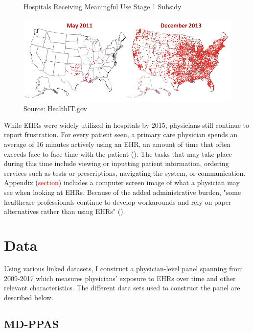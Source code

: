 \documentclass[11pt]{article}
\begin{document}
\begin{figure}[ht]
    \centering
    \caption{Hospitals Receiving Meaningful Use Stage 1 Subsidy}
    \includegraphics[scale=.6]{Objects/QS-Hospitals-Receiving-Payments-for-MU-and-Adoption.png}
    \caption*{Source: HealthIT.gov}
    \label{fig:meanuse}
\end{figure}


While EHRs were widely utilized in hospitals by 2015, physicians still continue to report frustration. For every patient seen, a primary care physician spends an average of 16 minutes actively using an EHR, an amount of time that often exceeds face to face time with the patient (\cite{overhage2020physician}). The tasks that may take place during this time include viewing or inputting patient information, ordering services such as tests or prescriptions, navigating the system, or communication. Appendix (\textcolor{red}{section}) includes a computer screen image of what a physician may see when looking at EHRs. Because of the added administrative burden, "some healthcare professionals continue to develop workarounds and rely on paper alternatives rather than using EHRs" (\cite{evans2016electronic}).

\section{Data}

Using various linked datasets, I construct a physician-level panel spanning from 2009-2017 which measures physicians' exposure to EHRs over time and other relevant characteristics. The different data sets used to construct the panel are described below.

\subsection{MD-PPAS}
\end{document}
